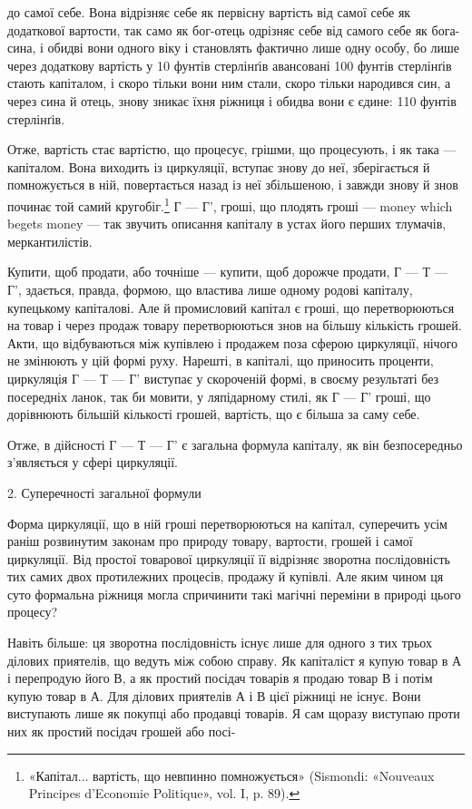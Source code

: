 до самої себе. Вона відрізняє себе як первісну вартість від самої
себе як додаткової вартости, так само як бог-отець одрізняє
себе від самого себе як бога-сина, і обидві вони одного віку
і становлять фактично лише одну особу, бо лише через додаткову
вартість у 10 фунтів стерлінґів авансовані 100 фунтів стерлінґів
стають капіталом, і скоро тільки вони ним стали, скоро тільки
народився син, а через сина й отець, знову зникає їхня ріжниця
і обидва вони є єдине: 110 фунтів стерлінґів.

Отже, вартість стає вартістю, що процесує, грішми, що процесують,
і як така — капіталом. Вона виходить із циркуляції,
вступає знову до неї, зберігається й помножується в ній, повертається
назад із неї збільшеною, і завжди знову й знов починає той
самий кругобіг.\footnote{
«Капітал... вартість, що невпинно помножується» (Sismondi: «Nouveaux
Principes d’Economie Politique», vol. I, p. 89).
} Г — Г', гроші, що плодять гроші — money which
begets money — так звучить описання капіталу в устах його
перших тлумачів, меркантилістів.

Купити, щоб продати, або точніше — купити, щоб дорожче
продати, Г — Т — Г', здається, правда, формою, що властива
лише одному родові капіталу, купецькому капіталові. Але й
промисловий капітал є гроші, що перетворюються на товар і
через продаж товару перетворюються знов на більшу кількість
грошей. Акти, що відбуваються між купівлею і продажем поза
сферою циркуляції, нічого не змінюють у цій формі руху. Нарешті,
в капіталі, що приносить проценти, циркуляція Г — Т — Г'
виступає у скороченій формі, в своєму результаті без посередніх
ланок, так би мовити, у ляпідарному стилі, як Г — Г' гроші, що
дорівнюють більшій кількості грошей, вартість, що є більша за
саму себе.

Отже, в дійсності Г — Т — Г' є загальна формула капіталу,
як він безпосередньо з’являється у сфері циркуляції.

2. Суперечності загальної формули

Форма циркуляції, що в ній гроші перетворюються на капітал,
суперечить усім раніш розвинутим законам про природу товару,
вартости, грошей і самої циркуляції. Від простої товарової
циркуляції її відрізняє зворотна послідовність тих самих двох
протилежних процесів, продажу й купівлі. Але яким чином
ця суто формальна ріжниця могла спричинити такі магічні переміни
в природі цього процесу?

Навіть більше: ця зворотна послідовність існує лише для
одного з тих трьох ділових приятелів, що ведуть між собою
справу. Як капіталіст я купую товар в А і перепродую його В,
а як простий посідач товарів я продаю товар В і потім купую
товар в А. Для ділових приятелів А і В цієї ріжниці не існує.
Вони виступають лише як покупці або продавці товарів. Я сам
щоразу виступаю проти них як простий посідач грошей або посі-